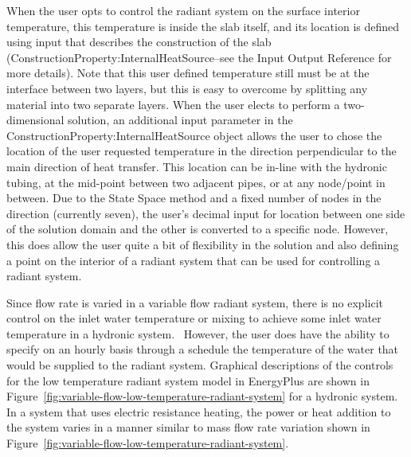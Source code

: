 When the user opts to control the radiant system on the surface interior
temperature, this temperature is inside the slab itself, and its location is
defined using input that describes the construction of the slab
(ConstructionProperty:InternalHeatSource--see the Input Output Reference for
more details).  Note that this user defined temperature still must be at the
interface between two layers, but this is easy to overcome by splitting any
material into two separate layers.  When the user elects to perform a
two-dimensional solution, an additional input parameter in the
ConstructionProperty:InternalHeatSource object allows the user to chose the
location of the user requested temperature in the direction perpendicular to
the main direction of heat transfer.  This location can be in-line with the
hydronic tubing, at the mid-point between two adjacent pipes, or at any
node/point in between.  Due to the State Space method and a fixed number of
nodes in the direction (currently seven), the user's decimal input for location
between one side of the solution domain and the other is converted to a
specific node.  However, this does allow the user quite a bit of flexibility in
the solution and also defining a point on the interior of a radiant system that
can be used for controlling a radiant system.

Since flow rate is varied in a variable flow radiant system, there is no explicit control on the inlet water temperature or mixing to achieve some inlet water temperature in a hydronic system.~ However, the user does have the ability to specify on an hourly basis through a schedule the temperature of the water that would be supplied to the radiant system.  Graphical descriptions of the controls for the low temperature radiant system model in EnergyPlus are shown in Figure~\ref{fig:variable-flow-low-temperature-radiant-system} for a hydronic system.~ In a system that uses electric resistance heating, the power or heat addition to the system varies in a manner similar to mass flow rate variation shown in Figure~\ref{fig:variable-flow-low-temperature-radiant-system}.

